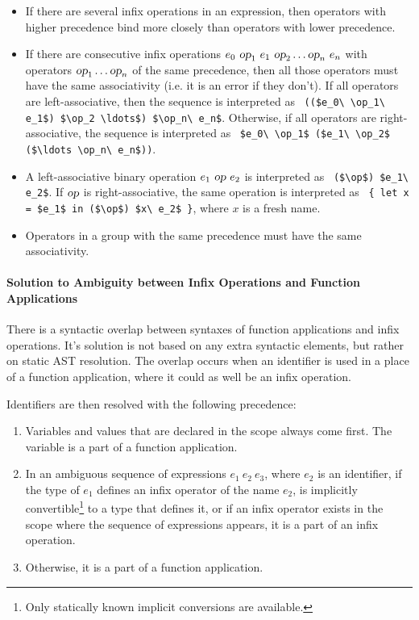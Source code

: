 \begin{itemize}
  \item If there are several infix operations in an expression, then operators with higher precedence bind more closely than operators with lower precedence. 
  
  \item If there are consecutive infix operations $e_0\ \mbox{\sl op}_1\ e_1\ \mbox{\sl op}_2 \ldots \mbox{\sl op}_n\ e_n$ with operators $\mbox{\sl op}_1 \ldots \mbox{\sl op}_n$ of the same precedence, then all those operators must have the same associativity (i.e. it is an error if they don't). If all operators are left-associative, then the sequence is interpreted as ~\lstinline!(($e_0\ \op_1\ e_1$) $\op_2 \ldots$) $\op_n\ e_n$!. Otherwise, if all operators are right-associative, the sequence is interpreted as ~\lstinline!$e_0\ \op_1$ ($e_1\ \op_2$ ($\ldots \op_n\ e_n$))!.

  \item A left-associative binary operation $e_1\ \mbox{\sl op}\ e_2$ is interpreted as ~\lstinline!($\op$) $e_1\ e_2$!. If $\mbox{\sl op}$ is right-associative, the same operation is interpreted as ~\lstinline!{ let x = $e_1$ in ($\op$) $x\ e_2$ }!, where $x$ is a fresh name. 

  \item Operators in a group with the same precedence must have the same associativity. 

\end{itemize}





\paragraph{Solution to Ambiguity between Infix Operations and Function Applications}

There is a syntactic overlap between syntaxes of function applications and infix operations. It's solution is not based on any extra syntactic elements, but rather on static AST resolution. The overlap occurs when an identifier is used in a place of a function application, where it could as well be an infix operation. 

Identifiers are then resolved with the following precedence:
\begin{enumerate}
  \item Variables and values that are declared in the scope always come first. The variable is a part of a function application. 
  \item In an ambiguous sequence of expressions $e_1\ e_2\ e_3$, where $e_2$ is an identifier, if the type of $e_1$ defines an infix operator of the name $e_2$, is implicitly convertible\footnote{Only statically known implicit conversions are available.} to a type that defines it, or if an infix operator exists in the scope where the sequence of expressions appears, it is a part of an infix operation. 
  \item Otherwise, it is a part of a function application.  
\end{enumerate}


